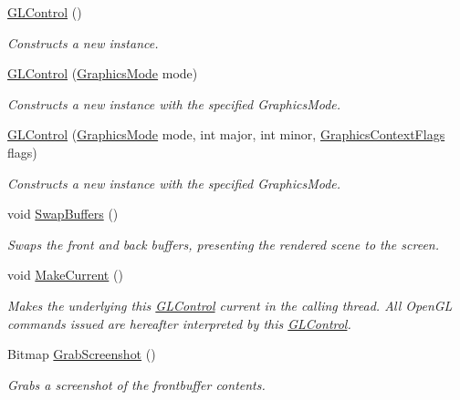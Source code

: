 \begin{DoxyCompactItemize}
\item 
\hyperlink{class_open_t_k_1_1_g_l_control_a3c8a3c8ce52ed0ba89d0dc3daea3f383}{G\-L\-Control} ()
\begin{DoxyCompactList}\small\item\em Constructs a new instance. \end{DoxyCompactList}\item 
\hyperlink{class_open_t_k_1_1_g_l_control_a2382a1304dc1971b3570eb88bbb8ac5c}{G\-L\-Control} (\hyperlink{class_open_t_k_1_1_graphics_1_1_graphics_mode}{Graphics\-Mode} mode)
\begin{DoxyCompactList}\small\item\em Constructs a new instance with the specified Graphics\-Mode. \end{DoxyCompactList}\item 
\hyperlink{class_open_t_k_1_1_g_l_control_a42d57de7e13a9555885988bd6c03fdc5}{G\-L\-Control} (\hyperlink{class_open_t_k_1_1_graphics_1_1_graphics_mode}{Graphics\-Mode} mode, int major, int minor, \hyperlink{namespace_open_t_k_1_1_graphics_a518f77952bc406a013160356981ea8ab}{Graphics\-Context\-Flags} flags)
\begin{DoxyCompactList}\small\item\em Constructs a new instance with the specified Graphics\-Mode. \end{DoxyCompactList}\item 
void \hyperlink{class_open_t_k_1_1_g_l_control_a81c23208d1aad50a1a2dc802ac2994e7}{Swap\-Buffers} ()
\begin{DoxyCompactList}\small\item\em Swaps the front and back buffers, presenting the rendered scene to the screen. \end{DoxyCompactList}\item 
void \hyperlink{class_open_t_k_1_1_g_l_control_a1dfec39a3af930c07d2096ad44e3981b}{Make\-Current} ()
\begin{DoxyCompactList}\small\item\em Makes the underlying this \hyperlink{class_open_t_k_1_1_g_l_control}{G\-L\-Control} current in the calling thread. All Open\-G\-L commands issued are hereafter interpreted by this \hyperlink{class_open_t_k_1_1_g_l_control}{G\-L\-Control}. \end{DoxyCompactList}\item 
Bitmap \hyperlink{class_open_t_k_1_1_g_l_control_a30a284cdfb9157eafb3dad53809f4121}{Grab\-Screenshot} ()
\begin{DoxyCompactList}\small\item\em Grabs a screenshot of the frontbuffer contents.\end{DoxyCompactList}\end{DoxyCompactItemize}
